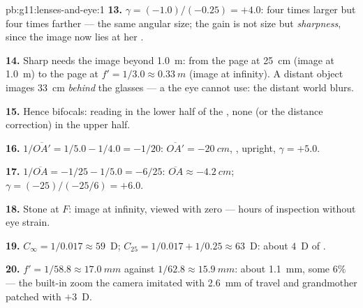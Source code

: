 \begin{solution}{pb:g11:lenses-and-eye:1}
\textbf{13.} $\gamma = (-1.0)/(-0.25) = +4.0$: four times larger but
four times farther --- the same angular size; the gain is not size but
\emph{sharpness}, since the image now lies at her .

\textbf{14.} Sharp needs the image beyond \qty{1.0}{m}: from the page
at \qty{25}{cm} (image at \qty{1.0}{m}) to the page at
$f' = 1/3.0 \approx \qty{0.33}{m}$ (image at infinity). A distant
object images \qty{33}{cm} \emph{behind} the glasses --- a 
the eye cannot use: the distant world blurs.

\textbf{15.} Hence bifocals: reading  in the lower half of the
, none (or the distance correction) in the upper half.

\textbf{16.} $1/\overline{OA'} = 1/5.0 - 1/4.0 = -1/20$:
$\overline{OA'} = \qty{-20}{cm}$, , upright, $\gamma = +5.0$.

\textbf{17.} $1/\overline{OA} = -1/25 - 1/5.0 = -6/25$:
$\overline{OA} \approx \qty{-4.2}{cm}$; $\gamma = (-25)/(-25/6) = +6.0$.

\textbf{18.} Stone at $F$: image at infinity, viewed with zero
 --- hours of inspection without eye strain.

\textbf{19.} $C_\infty = 1/0.017 \approx 59$~D;
$C_{25} = 1/0.017 + 1/0.25 \approx 63$~D: about $4$~D of
.

\textbf{20.} $f' = 1/58.8 \approx \qty{17.0}{mm}$ against
$1/62.8 \approx \qty{15.9}{mm}$: about \qty{1.1}{mm}, some $6\%$ ---
the built-in zoom the camera imitated with \qty{2.6}{mm} of travel and
grandmother patched with $+3$~D.
\end{solution}
